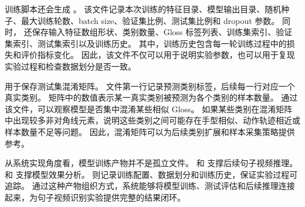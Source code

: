 训练脚本还会生成 。
该文件记录本次训练的特征目录、模型输出目录、随机种子、最大训练轮数、batch size、验证集比例、测试集比例和 dropout 参数。
同时， 还保存输入特征数组形状、类别数量、Gloss 标签列表、训练集索引、验证集索引、测试集索引以及训练历史。
其中，训练历史包含每一轮训练过程中的损失和评价指标变化。
因此，该文件不仅可以用于说明实验参数，也可以用于复现实验过程和检查数据划分是否一致。

 用于保存测试集混淆矩阵。
文件第一行记录预测类别标签，后续每一行对应一个真实类别。
矩阵中的数值表示某一真实类别被预测为各个类别的样本数量。
通过该文件，可以观察模型是否集中混淆某些相似 Gloss。
如果某些类别在混淆矩阵中出现较多非对角线元素，说明这些类别之间可能存在手型相似、动作轨迹相近或样本数量不足等问题。
因此，混淆矩阵可以为后续类别扩展和样本采集策略提供参考。

从系统实现角度看，模型训练产物并不是孤立文件。
 和  支撑后续句子视频推理。
 和  支撑模型效果分析。
 则记录训练配置、数据划分和训练历史，保证实验过程可追踪。
通过这种产物组织方式，系统能够将模型训练、测试评估和后续推理连接起来，为句子视频识别实验提供完整的结果闭环。
